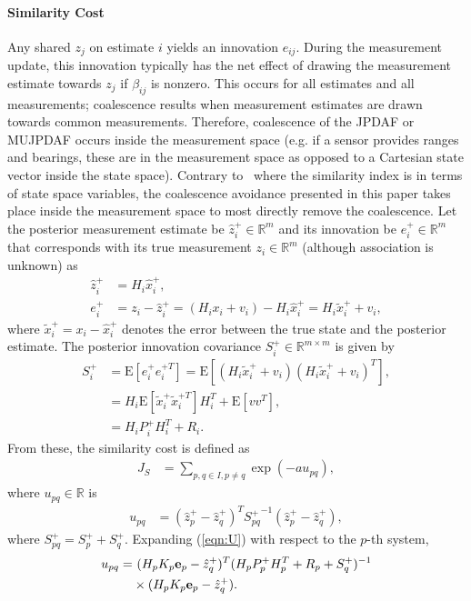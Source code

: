 \documentclass[letterpaper, 10pt, conference]{ieeeconf}
\newcommand{\refeqn}[1]{(\ref{eqn:#1})}
\renewcommand{\Re}{\ensuremath{\mathbb{R}}}
\begin{document}
\paragraph*{Similarity Cost}
Any shared $z_j$ on estimate $i$ yields an innovation $e_{ij}$.
During the measurement update, this innovation typically has the net effect of drawing the measurement estimate towards $z_j$ if $\beta_{ij}$ is nonzero.
This occurs for all estimates and all measurements; coalescence results when measurement estimates are drawn towards common measurements.
Therefore, coalescence of the JPDAF or MUJPDAF occurs inside the measurement space (e.g. if a sensor provides ranges and bearings, these are in the measurement space as opposed to a Cartesian state vector inside the state space).
Contrary to~\cite{KauLovLee14} where the similarity index is in terms of state space variables, the coalescence avoidance presented in this paper takes place inside the measurement space to most directly remove the coalescence.
Let the posterior measurement estimate be $\hat z_i^+\in\Re^m$ and its innovation be $e_{i}^+\in\Re^m$ that corresponds with its true measurement $z_i\in\Re^m$ (although association is unknown) as
\begin{align}
\hat z_i^+&=H_i\hat x_i^+,
\\
e_{i}^+&=z_i-\hat z_i^+=(H_ix_i+v_i)-H_i\hat x_{i}^+=H_i\tilde x_i^++v_i,
\end{align}
where $\tilde x_i^+=x_i-\hat x_{i}^+$ denotes the error between the true state and the posterior estimate. The posterior innovation covariance $S^+_i\in\Re^{m\times m}$ is given by
\begin{align}
S^+_i&=\mathrm{E}[e_i^+e_i^{+T}]=\mathrm{E}[(H_i\tilde x_i^++v_i)(H_i\tilde x_i^++v_i)^T],\nonumber
\\
&=H_i\mathrm{E}[\tilde x_i^+\tilde x_i^{+T}]H_i^T+\mathrm{E}[vv^T],\nonumber
\\
&=H_iP^+_iH_i^T+R_i.
\end{align}
From these, the similarity cost is defined as
\begin{align}
J_S&=\sum\limits_{p,q\in I,p\neq q}\exp (-au_{pq}),
\end{align}
where $u_{pq}\in\Re$ is
\begin{align}
u_{pq} & = (\hat z_{p}^+-\hat z^+_{q})^T{S^+_{pq}}^{-1}(\hat z^+_{p}-\hat z^+_{q})\label{eqn:U},
\end{align}
where $S^+_{pq}=S^+_{p}+S^+_{q}$. Expanding \refeqn{U} with respect to the $p$-th system,
\begin{align}
u_{pq}=&\ 
(H_pK_p{\bf e}_p-\hat z^+_{q})^T
(H_pP^+_{p}H_p^T+R_p+S^+_q)^{-1}\nonumber
\\
&\times  
(H_pK_p{\bf e}_p-\hat z^+_{q}).
\end{align}
\newcommand{\Ibd}{\ensuremath{\mathbf{1}_{bd}}}
\end{document}
